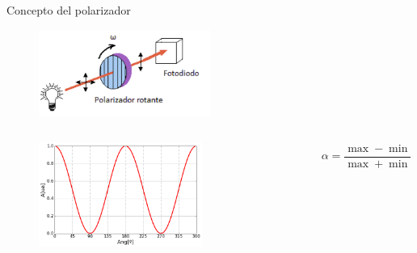 \begin{frame}[fragile]{Concepto del polarizador}
        \begin{figure}[H]
                    \centering
                    \includegraphics[width=0.5\textwidth]{fig/polarimetro/esquema}
                    \label{fig:polarimetro}
            \end{figure}
        \begin{columns}
            \begin{column}{0.5\textwidth}
                
                \begin{figure}[H]
                    \centering
                    \includegraphics[width=0.7\textwidth]{fig/polarimetro/malus}
                    \label{fig:polarimetro}
                \end{figure}
            \end{column}
            \begin{column}{0.5\textwidth}
                
                \[ \alpha = \frac{\max - \min}{\max + \min} = \begin{cases} 1 & \text{lineal} \\ 0 & \text{circular} \end{cases}\]
            \end{column}
        \end{columns}
   
\end{frame}

